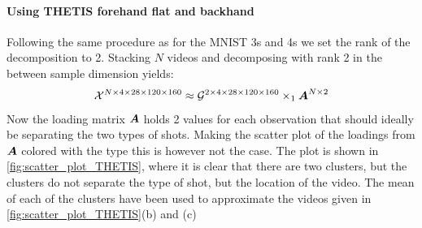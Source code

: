 \paragraph{Using THETIS forehand flat and backhand}
Following the same procedure as for the MNIST 3s and 4s we set the rank of the decomposition to 2. Stacking $N$ videos and decomposing with rank 2 in the between sample dimension yields:
\begin{equation}
    \mathcal{X}^{N\times 4 \times 28 \times 120 \times 160} \approx \mathcal{G}^{2 \times 4 \times 28 \times 120 \times 160} \times_1 \boldsymbol{A}^{N\times 2}
\end{equation}
Now the loading matrix $\boldsymbol{A}$ holds 2 values for each observation that should ideally be separating the two types of shots. Making the scatter plot of the loadings from $\boldsymbol{A}$ colored with the type this is however not the case. The plot is shown in \autoref{fig:scatter_plot_THETIS}, where it is clear that there are two clusters, but the clusters do not separate the type of shot, but the location of the video. The mean of each of the clusters have been used to approximate the videos given in \autoref{fig:scatter_plot_THETIS}(b) and (c)
